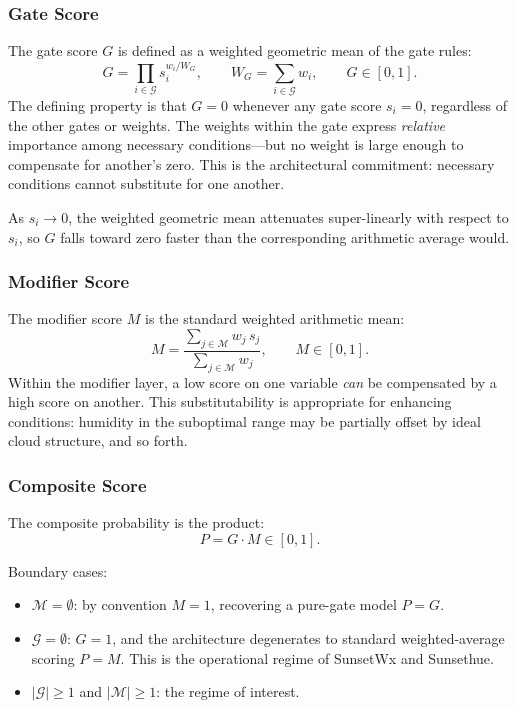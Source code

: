 \documentclass[11pt,a4paper]{article}
\begin{document}
\subsubsection{Gate Score}

The gate score $G$ is defined as a weighted geometric mean of the gate rules:
\begin{equation}
G = \prod_{i \in \mathcal{G}} s_i^{w_i / W_G}, \qquad W_G = \sum_{i \in \mathcal{G}} w_i, \qquad G \in [0, 1].
\label{eq:gate}
\end{equation}
The defining property is that $G = 0$ whenever any gate score $s_i = 0$, regardless of the other gates or weights. The weights within the gate express \emph{relative} importance among necessary conditions---but no weight is large enough to compensate for another's zero. This is the architectural commitment: necessary conditions cannot substitute for one another.

As $s_i \to 0$, the weighted geometric mean attenuates super-linearly with respect to $s_i$, so $G$ falls toward zero faster than the corresponding arithmetic average would.

\subsubsection{Modifier Score}

The modifier score $M$ is the standard weighted arithmetic mean:
\begin{equation}
M = \frac{\sum_{j \in \mathcal{M}} w_j \, s_j}{\sum_{j \in \mathcal{M}} w_j}, \qquad M \in [0, 1].
\label{eq:modifier}
\end{equation}
Within the modifier layer, a low score on one variable \emph{can} be compensated by a high score on another. This substitutability is appropriate for enhancing conditions: humidity in the suboptimal range may be partially offset by ideal cloud structure, and so forth.

\subsubsection{Composite Score}

The composite probability is the product:
\begin{equation}
P = G \cdot M \in [0, 1].
\label{eq:composite}
\end{equation}

Boundary cases:
\begin{itemize}
\item $\mathcal{M} = \emptyset$: by convention $M = 1$, recovering a pure-gate model $P = G$.
\item $\mathcal{G} = \emptyset$: $G = 1$, and the architecture degenerates to standard weighted-average scoring $P = M$. This is the operational regime of SunsetWx and Sunsethue.
\item $|\mathcal{G}| \geq 1$ and $|\mathcal{M}| \geq 1$: the regime of interest.
\end{itemize}
\end{document}

